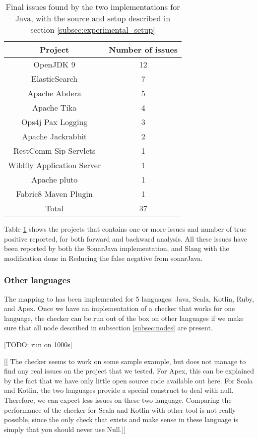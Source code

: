 \begin{table}[h]
	\centering
	\caption{Final issues found by the two implementations for Java, with the source and setup described in section \ref{subsec:experimental_setup}}
	\label{table:issues-per-project}
	\begin{tabular}{|c|c|}
		\hline
		\bf Project & \bf Number of issues\\ \hline
		OpenJDK 9 & 12 \\
		ElasticSearch & 7 \\
		Apache Abdera & 5 \\
		Apache Tika & 	4 \\
		Ops4j Pax Logging & 3 \\
		Apache Jackrabbit & 2 \\
		RestComm Sip Servlets & 1 \\
		Wildfly Application Server & 1 \\
		Apache pluto & 1 \\
		Fabric8 Maven Plugin & 1 \\\hline
		Total &  37 \\ \hline
	\end{tabular}
\end{table}


Table \ref{table:issues-per-project} shows the projects that contains one or more issues and number of true positive reported, for both forward and backward analysis. All these issues have been reported by both the SonarJava implementation, and Slang with the modification done in Reducing the false negative from sonarJava.


\subsubsection{Other languages}
\label{subsubsec:other_languages}

The mapping to \slang has been implemented for 5 languages: Java, Scala, Kotlin, Ruby, and Apex. Once we have an implementation of a checker that works for one language, the checker can be run out of the box on other languages if we make sure that all node described in subsection \ref{subsec:nodes} are present.

[TODO: run on 1000s] \newline

[[ The checker seems to work on some sample example, but does not manage to find any real issues on the project that we tested. For Apex, this can be explained by the fact that we have only little open source code available out here. For Scala and Kotlin, the two languages provide a special construct to deal with null. Therefore, we can expect less issues on these two language. Comparing the performance of the checker for Scala and Kotlin with other tool is not really possible, since the only check that exists and make sense in these language is simply that you should never use Null.]]

